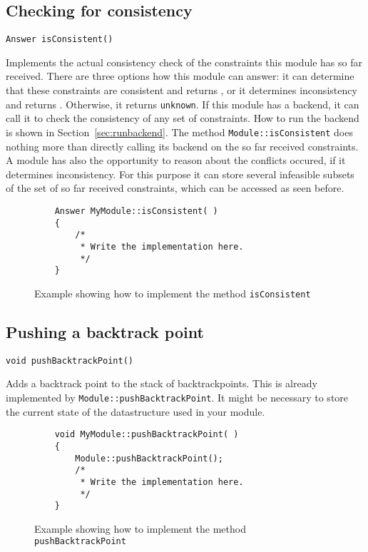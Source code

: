 \subsection{Checking for consistency}
\begin{verbatim}Answer isConsistent()\end{verbatim}
Implements the actual consistency check of the constraints this module has so far received.
There are three options how this module can answer: it can determine that these constraints
are consistent and returns \true, or it determines inconsistency and returns
\false. Otherwise, it returns \texttt{unknown}. If this module has a backend, it can call it
to check the consistency of any set of constraints. How to run the backend is shown in
Section~\ref{sec:runbackend}. The method \texttt{Module::isConsistent} does nothing more than directly
calling its backend on the
so far received constraints. A module has also the opportunity to reason about the conflicts
occured, if it determines inconsistency. For this purpose it can store several infeasible
subsets of the set of so far received constraints, which can be accessed as seen before.

\begin{figure}[htb]
\label{fig:exa_isconsistent}
\caption{Example showing how to implement the method \texttt{isConsistent}}
\begin{verbatim}
	Answer MyModule::isConsistent( )
	{
	    /*
	     * Write the implementation here.
	     */
	}
\end{verbatim}
\end{figure}

\subsection{Pushing a backtrack point}
\begin{verbatim}void pushBacktrackPoint()\end{verbatim}
Adds a backtrack point to the stack of backtrackpoints. This is already implemented by
\texttt{Module::pushBacktrackPoint}. It might be necessary to store the current state
of the datastructure used in your module.

\begin{figure}[htb]
\label{fig:exa_pushBacktrackPoint}
\caption{Example showing how to implement the method \texttt{pushBacktrackPoint}}
\begin{verbatim}
	void MyModule::pushBacktrackPoint( )
	{
	    Module::pushBacktrackPoint();
	    /*
	     * Write the implementation here.
	     */
	}
\end{verbatim}
\end{figure}

